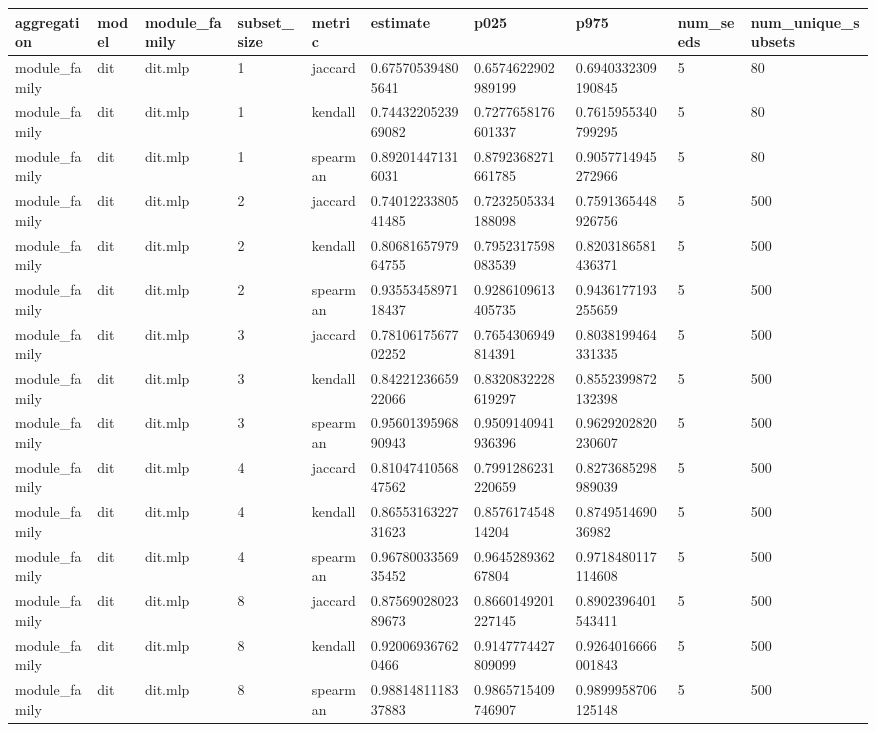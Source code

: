 \begin{tabular}{llllllllll}
 \toprule
aggregation & model & module\_family & subset\_size & metric & estimate & p025 & p975 & num\_seeds & num\_unique\_subsets \\
 \midrule
module\_family & dit & dit.mlp & 1 & jaccard & 0.675705394805641 & 0.6574622902989199 & 0.6940332309190845 & 5 & 80 \\
module\_family & dit & dit.mlp & 1 & kendall & 0.7443220523969082 & 0.7277658176601337 & 0.7615955340799295 & 5 & 80 \\
module\_family & dit & dit.mlp & 1 & spearman & 0.892014471316031 & 0.8792368271661785 & 0.9057714945272966 & 5 & 80 \\
module\_family & dit & dit.mlp & 2 & jaccard & 0.7401223380541485 & 0.7232505334188098 & 0.7591365448926756 & 5 & 500 \\
module\_family & dit & dit.mlp & 2 & kendall & 0.8068165797964755 & 0.7952317598083539 & 0.8203186581436371 & 5 & 500 \\
module\_family & dit & dit.mlp & 2 & spearman & 0.9355345897118437 & 0.9286109613405735 & 0.9436177193255659 & 5 & 500 \\
module\_family & dit & dit.mlp & 3 & jaccard & 0.7810617567702252 & 0.7654306949814391 & 0.8038199464331335 & 5 & 500 \\
module\_family & dit & dit.mlp & 3 & kendall & 0.8422123665922066 & 0.8320832228619297 & 0.8552399872132398 & 5 & 500 \\
module\_family & dit & dit.mlp & 3 & spearman & 0.9560139596890943 & 0.9509140941936396 & 0.9629202820230607 & 5 & 500 \\
module\_family & dit & dit.mlp & 4 & jaccard & 0.8104741056847562 & 0.7991286231220659 & 0.8273685298989039 & 5 & 500 \\
module\_family & dit & dit.mlp & 4 & kendall & 0.8655316322731623 & 0.857617454814204 & 0.874951469036982 & 5 & 500 \\
module\_family & dit & dit.mlp & 4 & spearman & 0.9678003356935452 & 0.964528936267804 & 0.9718480117114608 & 5 & 500 \\
module\_family & dit & dit.mlp & 8 & jaccard & 0.8756902802389673 & 0.8660149201227145 & 0.8902396401543411 & 5 & 500 \\
module\_family & dit & dit.mlp & 8 & kendall & 0.920069367620466 & 0.9147774427809099 & 0.9264016666001843 & 5 & 500 \\
module\_family & dit & dit.mlp & 8 & spearman & 0.9881481118337883 & 0.9865715409746907 & 0.9899958706125148 & 5 & 500 \\

\end{tabular}
